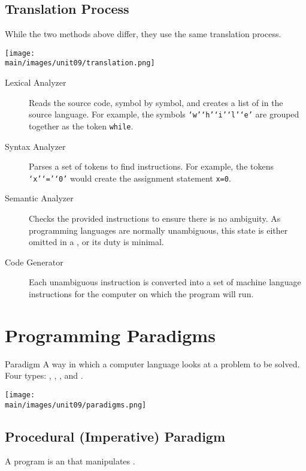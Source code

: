 \documentclass[\main/notes.tex]{subfiles}
\begin{document}
			\subsection{Translation Process}
				While the two methods above differ, they use the same translation process.
				\begin{center}
					\texttt{[image: \\main/images/unit09/translation.png]}
				\end{center}
				\begin{indentparagraph}
					\begin{description}
						\item[Lexical Analyzer] Reads the source code, symbol by symbol, and creates a list of  in the source language. For example, the symbols \texttt{`w'`h'`i'`l'`e'} are grouped together as the token \texttt{while}.
						\item[Syntax Analyzer] Parses a set of tokens to find instructions. For example, the tokens \texttt{`x'`='`0'} would create the assignment statement \texttt{x=0}.
						\item[Semantic Analyzer] Checks the provided instructions to ensure there is no ambiguity. As programming languages are normally unambiguous, this state is either omitted in a , or its duty is minimal.
						\item[Code Generator] Each unambiguous instruction is converted into a set of machine language instructions for the computer on which the program will run. 
					\end{description}
				\end{indentparagraph}

		\section{Programming Paradigms}
			\begin{definition}{Paradigm}
				A way in which a computer language looks at a problem to be solved. Four types: , , , and .
			\end{definition}
			\begin{center}
				\texttt{[image: \\main/images/unit09/paradigms.png]}
			\end{center}
			\subsection{Procedural (Imperative) Paradigm}
				A program is an  that manipulates .
\end{document}
